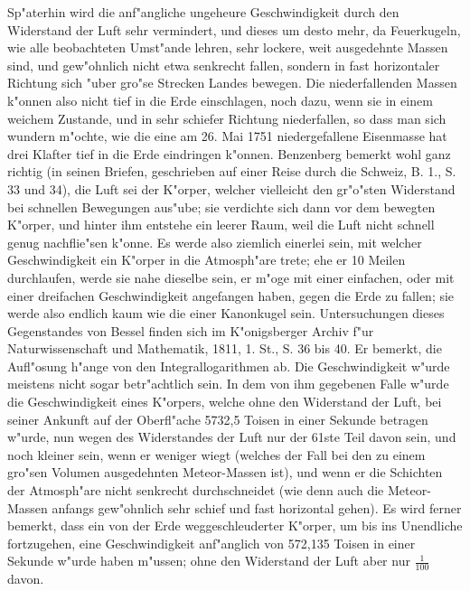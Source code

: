 \documentclass[a4paper, 11pt, oneside, polutonikogreek, german]{article}
\begin{document}
Sp"aterhin wird die anf"angliche ungeheure Geschwindigkeit durch den Widerstand der Luft sehr vermindert, und dieses um desto mehr, da Feuerkugeln, wie alle beobachteten Umst"ande lehren, sehr lockere, weit ausgedehnte Massen sind, und gew"ohnlich nicht etwa senkrecht fallen, sondern in fast horizontaler Richtung sich "uber gro"se Strecken Landes bewegen. Die niederfallenden Massen k"onnen also nicht tief in die Erde einschlagen, noch dazu, wenn sie in einem weichem Zustande, und in sehr schiefer Richtung niederfallen, so dass man sich wundern m"ochte, wie die eine am 26. Mai 1751 niedergefallene Eisenmasse hat drei Klafter tief in die Erde eindringen k"onnen. Benzenberg bemerkt wohl ganz richtig (in seinen Briefen, geschrieben auf einer Reise durch die Schweiz, B. 1., S. 33 und 34), die Luft sei der K"orper, welcher vielleicht den gr"o"sten Widerstand bei schnellen Bewegungen aus"ube; sie verdichte sich dann vor dem bewegten K"orper, und hinter ihm entstehe ein leerer Raum, weil die Luft nicht schnell genug nachflie"sen k"onne. Es werde also ziemlich einerlei sein, mit welcher Geschwindigkeit ein K"orper in die Atmosph"are trete; ehe er 10 Meilen durchlaufen, werde sie nahe dieselbe sein, er m"oge mit einer einfachen, oder mit einer dreifachen Geschwindigkeit angefangen haben, gegen die Erde zu fallen; sie werde also endlich kaum wie die einer Kanonkugel sein. Untersuchungen dieses Gegenstandes von Bessel finden sich im K"onigsberger Archiv f"ur Naturwissenschaft und Mathematik, 1811, 1. St., S. 36 bis 40. Er bemerkt, die Aufl"osung h"ange von den Integrallogarithmen ab. Die Geschwindigkeit w"urde meistens nicht sogar betr"achtlich sein. In dem von ihm gegebenen Falle w"urde die Geschwindigkeit eines K"orpers, welche ohne den Widerstand der Luft, bei seiner Ankunft auf der Oberfl"ache 5732,5 Toisen in einer Sekunde betragen w"urde, nun wegen des Widerstandes der Luft nur der 61ste Teil davon sein, und noch kleiner sein, wenn er weniger wiegt (welches der Fall bei den zu einem gro"sen Volumen ausgedehnten Meteor-Massen ist), und wenn er die Schichten der Atmosph"are nicht senkrecht durchschneidet (wie denn auch die Meteor-Massen anfangs gew"ohnlich sehr schief und fast horizontal gehen). Es wird ferner bemerkt, dass ein von der Erde weggeschleuderter K"orper, um bis ins Unendliche fortzugehen, eine Geschwindigkeit anf"anglich von 572,135 Toisen in einer Sekunde w"urde haben m"ussen; ohne den Widerstand der Luft aber nur $\mathfrak{\frac{1}{100}}$ davon.
\end{document}
